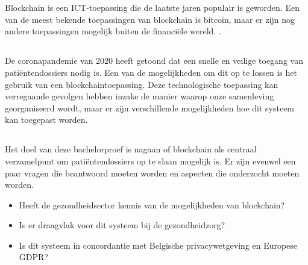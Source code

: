 
\chapter{}
\label{ch:inleiding}

Blockchain is een ICT-toepassing die de laatste jaren populair is geworden. Een van de meest bekende toepassingen van blockchain is bitcoin, maar er zijn nog andere toepassingen mogelijk buiten de financiële wereld. \autocite{Pilkington2016}.

\section{}
\label{sec:probleemstelling}

De coronapandemie van 2020 heeft getoond dat een snelle en veilige toegang van patiëntendossiers nodig is. Een van de mogelijkheden om dit op te lossen is het gebruik van een blockchaintoepassing. Deze technologische toepassing kan verregaande gevolgen hebben inzake de manier waarop onze samenleving georganiseerd wordt, maar er zijn verschillende mogelijkheden hoe dit systeem kan toegepast worden.

\section{}
\label{sec:onderzoeksvraag}

Het doel van deze bachelorproef is nagaan of blockchain als centraal verzamelpunt om patiëntendossiers op te slaan mogelijk is. Er zijn evenwel een paar vragen die beantwoord moeten worden en aspecten die onderzocht moeten worden.

\begin{itemize}
    \item Heeft de gezondheidsector kennis van de mogelijkheden van blockchain?
    \item Is er draagvlak voor dit systeem bij de gezondheidzorg?
    \item Is dit systeem in concordantie met Belgische privacywetgeving en Europese GDPR?
\end{itemize}

\section{}
\label{sec:onderzoeksdoelstelling}

